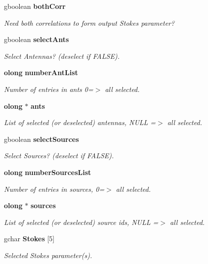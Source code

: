 \begin{CompactItemize}
gboolean {\bf both\-Corr}
\begin{CompactList}\small\item\em Need both correlations to form output Stokes parameter? \item\end{CompactList}\item 
gboolean {\bf select\-Ants}
\begin{CompactList}\small\item\em Select Antennas? (deselect if FALSE). \item\end{CompactList}\item 
{\bf olong} {\bf number\-Ant\-List}
\begin{CompactList}\small\item\em Number of entries in ants 0=$>$ all selected. \item\end{CompactList}\item 
{\bf olong} $\ast$ {\bf ants}
\begin{CompactList}\small\item\em List of selected (or deselected) antennas, NULL =$>$ all selected. \item\end{CompactList}\item 
gboolean {\bf select\-Sources}
\begin{CompactList}\small\item\em Select Sources? (deselect if FALSE). \item\end{CompactList}\item 
{\bf olong} {\bf number\-Sources\-List}
\begin{CompactList}\small\item\em Number of entries in sources, 0=$>$ all selected. \item\end{CompactList}\item 
{\bf olong} $\ast$ {\bf sources}
\begin{CompactList}\small\item\em List of selected (or deselected) source ids, NULL =$>$ all selected. \item\end{CompactList}\item 
gchar {\bf Stokes} [5]
\begin{CompactList}\small\item\em Selected Stokes parameter(s). \item\end{CompactList}\item 

\end{CompactItemize}
